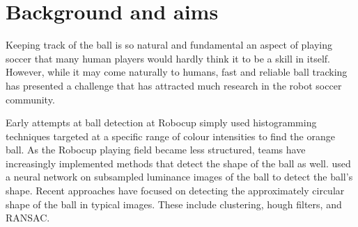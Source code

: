 \documentclass[11pt]{scrartcl} %
\begin{document}
	\section{Background and aims} {




        Keeping track of the ball is so natural and fundamental an aspect of
        playing soccer that many human players would hardly think it to be a
        skill in itself.
        However, while it may come naturally to humans, fast and reliable ball
        tracking has presented a challenge that has attracted much research in
        the robot soccer community.
        

        Early attempts at ball detection at Robocup simply used histogramming
        techniques targeted at a specific range of colour intensities to find
        the orange ball.  As the Robocup playing field became less structured,
        teams have increasingly implemented methods that detect the shape of
        the ball as well.
        \citet{schulz2007ball} used a neural network on
        subsampled luminance images of the ball to detect the ball's shape.
        Recent approaches have focused on detecting the approximately
        circular shape of the ball in typical images. These include
        clustering, hough filters, and RANSAC.

}
\end{document}
